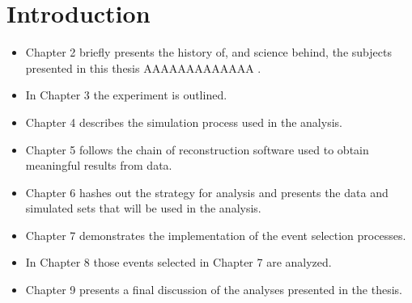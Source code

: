 \chapter{Introduction}
\label{intro_chapter}

\begin{itemize}


\item Chapter 2 briefly presents the history of, and science behind, the
subjects presented in this thesis AAAAAAAAAAAAA .

\item In Chapter 3 the experiment is outlined.

\item Chapter 4 describes the simulation process used in the analysis.

\item Chapter 5 follows the chain of reconstruction software used to obtain
meaningful results from data.

\item Chapter 6 hashes out the strategy for analysis and presents the data and
simulated sets that will be used in the analysis.

\item Chapter 7 demonstrates the implementation of the event selection
processes.

\item In Chapter 8 those events selected in Chapter 7 are analyzed.

\item Chapter 9 presents a final discussion of the analyses presented in the
thesis.

\end{itemize}
